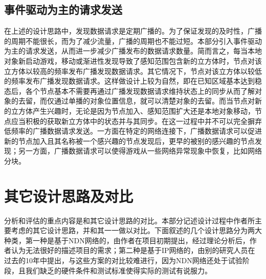 \subsection*{事件驱动为主的请求发送}
\par
在上述的设计思路中，发现数据请求是定期广播的。为了保证发现的及时性，广播的周期不能很长，而为了减少流量，广播的周期也不能过短。本部分引入事件驱动为主的请求发送，从而进一步减少广播发布的数据请求数量。简而言之，每当本地对象新启动游戏，移动或渐进性发现导致了感知范围包含新的立方体时，节点对该立方体以较高的频率发布广播发现数据请求。其它情况下，节点对该立方体以较低的频率发布广播发现数据请求。这样做设计上较为自然，即在已知区域基本达到稳态后，各个节点基本不需要再通过广播发现数据请求维持状态上的同步从而了解对象的去留，而仅通过单播的对象位置信息，就可以清楚对象的去留。而当节点对新的立方体产生兴趣时，无论是因为节点加入、感知范围扩大还是本地对象移动，节点应当积极的获取新立方体中的状态并与其同步。在这一过程中并不可以完全摒弃低频率的广播数据请求发送。一方面在特定的网络连接下，广播数据请求可以促进新的节点加入且其名称被一个感兴趣的节点发现后，更早的被别的感兴趣的节点发现；另一方面，广播数据请求可以使得游戏从一些网络异常现象中恢复，比如网络分块。
\section{其它设计思路及对比}
\label{ComparisonSection}
\par
分析和评估的重点内容是和其它设计思路的对比。本部分记述设计过程中作者所主要考虑的其它设计思路，并和其一一做以对比。下面叙述的几个设计思路分为两大种类，第一种是基于NDN网络的，由作者在项目初期提出，经过理论分析后，作者认为无法很好的描述项目的需求；第二种是基于IP网络的，由别的研究人员在过去的10年中提出，与这些方案的对比较难进行，因为NDN网络还处于试验阶段，且我们缺乏的硬件条件和测试标准使得实际的测试有说服力。
